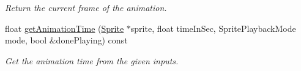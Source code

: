 \begin{DoxyCompactItemize}
\begin{DoxyCompactList}\small\item\em Return the current frame of the animation. \end{DoxyCompactList}\item 
\mbox{\label{classrev_1_1_sprite_animation_a3ff6d4a7c2ff75f3d0408b378b1da0a5}} 
float \mbox{\hyperlink{classrev_1_1_sprite_animation_a3ff6d4a7c2ff75f3d0408b378b1da0a5}{get\+Animation\+Time}} (\mbox{\hyperlink{classrev_1_1_sprite}{Sprite}} $\ast$sprite, float time\+In\+Sec, Sprite\+Playback\+Mode mode, bool \&done\+Playing) const
\begin{DoxyCompactList}\small\item\em Get the animation time from the given inputs. \end{DoxyCompactList}\end{DoxyCompactItemize}
